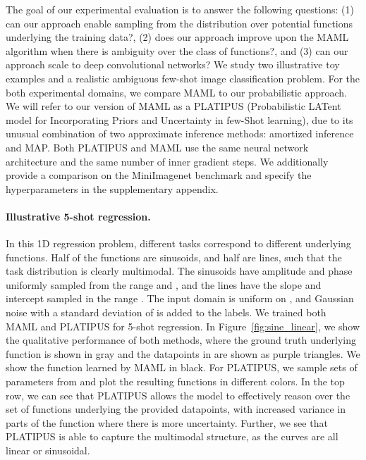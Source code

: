 \documentclass{article}
\begin{document}
The goal of our experimental evaluation is to answer the following questions: (1) can our approach enable sampling from the distribution over potential functions underlying the training data?, (2) does our approach improve upon the MAML algorithm when there is ambiguity over the class of functions?, and (3) can our approach scale to deep convolutional networks? We study two illustrative toy examples and a realistic ambiguous few-shot image classification problem.
For the both experimental domains, we compare MAML to our probabilistic approach. We will refer to our version of MAML as a PLATIPUS (Probabilistic LATent model for Incorporating Priors and Uncertainty in few-Shot learning), due to its unusual combination of two approximate inference methods: amortized inference and MAP.
Both PLATIPUS and MAML use the same neural network architecture and the same number of inner gradient steps.
We additionally provide a comparison on the MiniImagenet benchmark and specify the hyperparameters in the supplementary appendix.


\vspace{-0.1in}
\paragraph{Illustrative 5-shot regression.}
In this 1D regression problem, different tasks correspond to different underlying functions. Half of the functions are sinusoids, and half are lines, such that the task distribution is clearly multimodal. The sinusoids have amplitude and phase uniformly sampled from the range  and , and the lines have the slope and intercept sampled in the range . The input domain is uniform on , and Gaussian noise with a standard deviation of  is added to the labels.
We trained both MAML and PLATIPUS for 5-shot regression.
In Figure~\ref{fig:sine_linear}, we show the qualitative performance of both methods, where the ground truth underlying function is shown in gray and the datapoints in  are shown as purple triangles. We show the function  learned by MAML in black.
For PLATIPUS, we sample  sets of parameters from  and plot the resulting functions in different colors. In the top row, we can see that PLATIPUS allows the model to effectively reason over the set of functions underlying the provided datapoints, with increased variance in parts of the function where there is more uncertainty. Further, we see that PLATIPUS is able to capture the multimodal structure, as the curves are all linear or sinusoidal.
\end{document}
